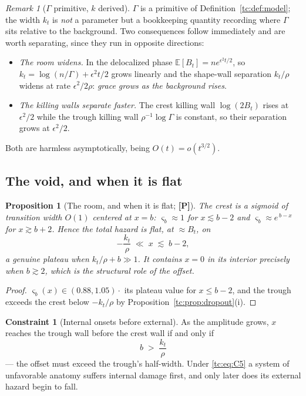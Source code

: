 \documentclass[11pt]{article}
\numberwithin{equation}{section}
\theoremstyle{plain}
\newtheorem{proposition}[theorem]{Proposition}
\theoremstyle{definition}
\newtheorem{constraint}{Constraint}
\theoremstyle{remark}
\newtheorem{remark}[theorem]{Remark}
\newcommand{\E}{\mathbb{E}}
\begin{document}
\begin{remark}[$\Gamma$ primitive, $k$ derived]\label{tc:rem:kderived}
$\Gamma$ is a primitive of Definition~\ref{tc:def:model}; the width
$k_t$ is \emph{not} a parameter but a bookkeeping quantity recording
where $\Gamma$ sits relative to the background. Two consequences follow
immediately and are worth separating, since they run in opposite
directions:
\begin{itemize}[itemsep=1pt]
\item \emph{The room widens.} In the delocalized phase
$\E[B_t]=ne^{\epsilon^{2}t/2}$, so $k_t=\log(n/\Gamma)+\epsilon^{2}t/2$
grows linearly and the shape-wall separation $k_t/\rho$ widens at rate
$\epsilon^{2}/2\rho$: \emph{grace grows as the background rises}.
\item \emph{The killing walls separate faster.} The crest killing wall
$\log(2B_t)$ rises at $\epsilon^{2}/2$ while the trough killing wall
$\rho^{-1}\log\Gamma$ is constant, so their separation grows at
$\epsilon^{2}/2$.
\end{itemize}
Both are harmless asymptotically, being $O(t)=o(t^{3/2})$.
\end{remark}

\subsection{The void, and when it is flat}\label{tc:subsub:void}

\begin{proposition}[The room, and when it is flat; \textbf{[P]}]
\label{tc:prop:flat}
The crest is a sigmoid of transition width $O(1)$ centered at $x=b$:
$\varsigma_b\approx1$ for $x\lesssim b-2$ and $\varsigma_b\approx
e^{\,b-x}$ for $x\gtrsim b+2$. Hence the total hazard is flat, at
$\approx B_t$, on
\begin{equation}\label{tc:eq:flat}
-\frac{k_t}{\rho}\;\ll\;x\;\lesssim\;b-2 ,
\end{equation}
a genuine plateau when $k_t/\rho+b\gg1$. It contains $x=0$ in its
interior precisely when $b\gtrsim2$, which is the structural role of the
offset.
\end{proposition}

\begin{proof}
$\varsigma_b(x)\in(0.88,1.05)\cdot$ its plateau value for
$x\le b-2$, and the trough exceeds the crest below $-k_t/\rho$ by
Proposition~\ref{tc:prop:dropout}(i).
\end{proof}

\begin{constraint}[Internal onsets before external]\label{tc:C5}
As the amplitude grows, $x$ reaches the trough wall before the crest
wall if and only if
\begin{equation}\label{tc:eq:C5}
\boxed{\;b\;>\;\frac{k_t}{\rho}\;}
\end{equation}
--- the offset must exceed the trough's half-width. Under
\eqref{tc:eq:C5} a system of unfavorable anatomy suffers internal
damage first, and only later does its external hazard begin to fall.
\end{constraint}
\end{document}
